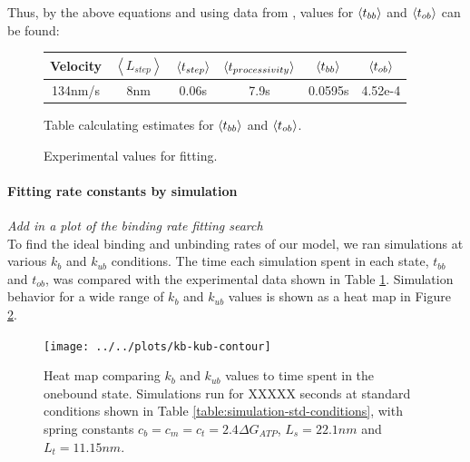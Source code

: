 \documentclass[10pt]{article} %
\begin{document}
Thus, by the above equations and using data from \cite{weihongpaper}, values for $\left<t_{bb}\right>$ and $\left<t_{ob}\right>$ can be found:

\begin{figure}[h]
  \centering
  \begin{tabular}{| c | c | c | c | c | c |}
    \hline
    Velocity & $\left<L_{step}\right>$ & $\left<t_{step}\right>$ & $\left<t_{processivity}\right>$ & $\left<t_{bb}\right>$ & $\left<t_{ob}\right>$ \\ \hline
    134nm/s & 8nm & 0.06s & 7.9s & 0.0595s & 4.52e-4\\ \hline
  \end{tabular}
  \caption{Experimental values for fitting.}{Table calculating estimates for $\left<t_{bb}\right>$ and $\left<t_{ob}\right>$.}
  \label{table:time-parameter-table}
\end{figure}

\paragraph{Fitting rate constants by simulation}
\textit{Add in a plot of the binding rate fitting search}\\

To find the ideal binding and unbinding rates of our model, we ran simulations at various $k_b$ and $k_{ub}$ conditions. The time each simulation spent in each state, $t_{bb}$ and $t_{ob}$, was compared with the experimental data shown in Table \ref{table:time-parameter-table}. Simulation behavior for a wide range of $k_b$ and $k_{ub}$ values is shown as a heat map in Figure \ref{fig:kb-kub-heatmap}.\\

\begin{figure}[h!]
  \centering
  \texttt{[image: ../../plots/kb-kub-contour]}
  \caption{Heat map comparing $k_b$ and $k_{ub}$ values to time spent in the onebound state. Simulations run for XXXXX seconds at standard conditions shown in Table \ref{table:simulation-std-conditions}, with spring constants $c_b = c_m = c_t = 2.4\Delta G_{ATP}$, $L_s=22.1nm$ and $L_t=11.15nm$.}
  \label{fig:kb-kub-heatmap}
\end{figure}

\end{document}
